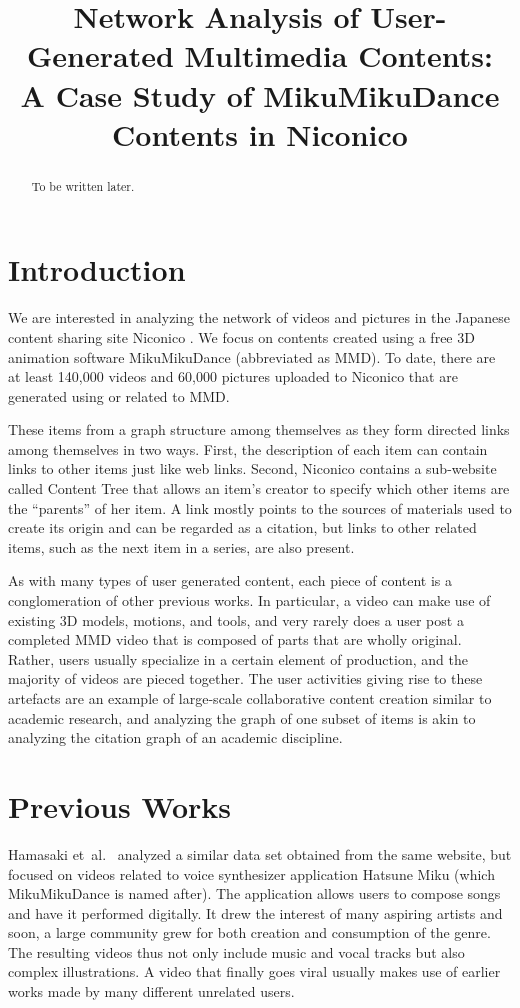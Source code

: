 \documentclass[10pt, a4paper]{article}
\title{Network Analysis of User-Generated Multimedia Contents:\\
A Case Study of MikuMikuDance Contents in Niconico}
\author{}
\newcommand{\etal}{{et~al.}}
\begin{document}
\maketitle

\begin{abstract}
To be written later.
\end{abstract}

\section{Introduction}

We are interested in analyzing the network of videos and pictures in the Japanese content sharing site Niconico \cite{niconico}. 
We focus on contents created using a free 3D animation software MikuMikuDance \cite{mmd} (abbreviated as MMD). 
To date, there are at least 140,000 videos and 60,000 pictures uploaded to Niconico that are generated using or related to MMD. 

These items from a graph structure among themselves as they form directed links among themselves in two ways. 
First, the description of each item can contain links to other items just like web links. 
Second, Niconico contains a sub-website called Content Tree \cite{content-tree} that allows an item’s creator to specify which other items are the “parents” of her item. 
A link mostly points to the sources of materials used to create its origin and can be regarded as a citation, but links to other related items, such as the next item in a series, are also present. 

As with many types of user generated content, each piece of content is a conglomeration of other previous works. In particular, a video can make use of existing 3D models, motions, and tools, and very rarely does a user post a completed MMD video that is composed of parts that are wholly original. Rather, users usually specialize in a certain element of production, and the majority of videos are pieced together. The user activities giving rise to these artefacts are an example of large-scale collaborative content creation similar to academic research, and analyzing the graph of one subset of items is akin to analyzing the citation graph of an academic discipline.

\section{Previous Works}

Hamasaki \etal~\cite{Hamasaki:2008} analyzed a similar data set obtained from the same website, but focused on videos related to voice synthesizer application Hatsune Miku (which MikuMikuDance is named after). 
The application allows users to compose songs and have it performed digitally. 
It drew the interest of many aspiring artists and soon, a large community grew for both creation and consumption of the genre. 
The resulting videos thus not only include music and vocal tracks but also complex illustrations. 
A video that finally goes viral usually makes use of earlier works made by many different unrelated users. 
\end{document}
